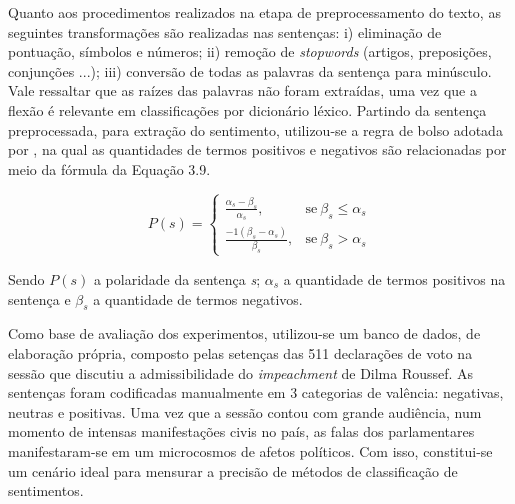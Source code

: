 \documentclass[
12pt,				%
openright,			%
twoside,			%
a4paper,			%
english,			%
french,				%
spanish,			%
brazil				%
]{abntex2}
\begin{document}
Quanto aos procedimentos realizados na etapa de preprocessamento do texto, as seguintes transformações são realizadas nas sentenças: i) eliminação de pontuação, símbolos e números; ii) remoção de \emph{stopwords} (artigos, preposições, conjunções ...); iii) conversão de todas as palavras da sentença para minúsculo. Vale ressaltar que as raízes das palavras não foram extraídas, uma vez que a flexão é relevante em classificações por dicionário léxico. Partindo da sentença preprocessada, para extração do sentimento, utilizou-se a regra de bolso adotada por , na qual as quantidades de termos positivos e negativos são relacionadas por meio da fórmula da Equação 3.9.

\begin{equation}
P(s) = 
\begin{cases}
\frac{\alpha_s - \beta_s}{\alpha_s}, & \text{se}\ \beta_s \leq \alpha_s \\
\frac{-1(\beta_s - \alpha_s)}{\beta_s}, & \text{se}\ \beta_s > \alpha_s
\end{cases}
\end{equation}

Sendo $P(s)$ a polaridade da sentença \emph{s}; $\alpha_s$ a quantidade de termos positivos na sentença e  $\beta_s$ a quantidade de termos negativos.

Como base de avaliação dos experimentos, utilizou-se um banco de dados, de elaboração própria, composto pelas setenças das 511 declarações de voto na sessão que discutiu a admissibilidade do \emph{impeachment} de Dilma Roussef. As sentenças foram codificadas manualmente em 3 categorias de valência: negativas, neutras e positivas. Uma vez que a sessão contou com grande audiência, num momento de intensas manifestações civis no país, as falas dos parlamentares manifestaram-se em um microcosmos de afetos políticos. Com isso, constitui-se um cenário ideal para mensurar a precisão de métodos de classificação de sentimentos.   
\end{document}
